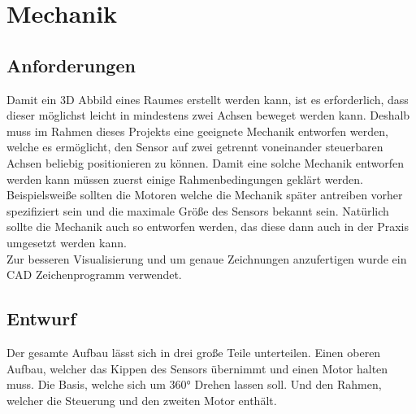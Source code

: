 \chapter{Mechanik}

\section{Anforderungen}
Damit ein \acs{3D} Abbild eines Raumes erstellt werden kann, ist es erforderlich, dass dieser möglichst leicht in mindestens zwei Achsen beweget werden kann. Deshalb muss im Rahmen dieses Projekts eine geeignete Mechanik entworfen werden, welche es ermöglicht, den Sensor auf zwei getrennt voneinander steuerbaren Achsen beliebig positionieren zu können. Damit eine solche Mechanik entworfen werden kann müssen zuerst einige Rahmenbedingungen geklärt werden. Beispielsweiße sollten die Motoren welche die Mechanik später antreiben vorher spezifiziert sein und die maximale Größe des Sensors bekannt sein. Natürlich sollte die Mechanik auch so entworfen werden, das diese dann auch in der Praxis umgesetzt werden kann.\\
Zur besseren Visualisierung und um genaue Zeichnungen anzufertigen wurde ein \ac{CAD} Zeichenprogramm verwendet. 
\section{Entwurf}
Der gesamte Aufbau lässt sich in drei große Teile unterteilen. Einen oberen Aufbau, welcher das Kippen des Sensors übernimmt und einen Motor halten muss. Die Basis, welche sich um 360° Drehen lassen soll. Und den Rahmen, welcher die Steuerung und den zweiten Motor enthält. 

